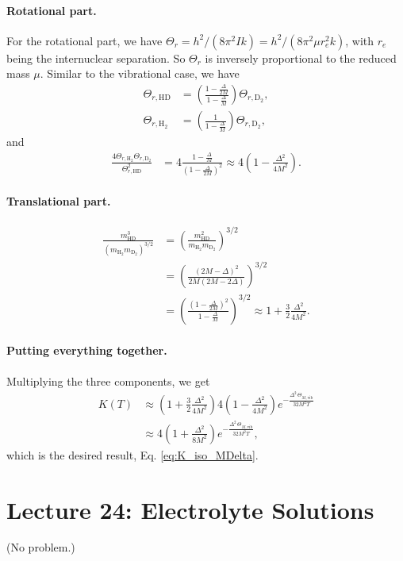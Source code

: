 \documentclass[twocolumn, 10pt]{article}
\numberwithin{equation}{section}
\newenvironment{solution}[1][\empty]
{\par\medskip\sffamily
  \textbf{\ifx\empty#1{Solution.}\relax\else{#1}\fi} \ignorespaces}
{\medskip}
\begin{document}
\begin{solution}
  \paragraph*{Rotational part.}
  For the rotational part,
  we have
  $\Theta_r = h^2/(8\pi^2Ik) = h^2/(8\pi^2\mu r_e^2 k)$,
  with $r_e$
  being the internuclear separation.
  So $\Theta_r$ is inversely proportional to
  the reduced mass $\mu$.
  Similar to the vibrational case, we have
  \begin{align*}
    \Theta_{r, \mathrm{HD}}
    &=
    \left(
    \frac{ 1 - \frac{\Delta}{2M} }
         { 1 - \frac{\Delta}{M} }
    \right)
    \Theta_{r, \mathrm{D}_2}
    ,
    \\
    \Theta_{r, \mathrm{H}_2}
    &=
    \left(
    \frac{ 1 }
         { 1-\frac{\Delta}{M} }
    \right)
    \Theta_{r, \mathrm{D}_2}
    ,
  \end{align*}
  and
  \begin{align*}
    \frac{
      4 \Theta_{r, \mathrm{H}_2}
      \Theta_{r, \mathrm{D}_2}
    } {
      \Theta_{r, \mathrm{HD}}^2
    }
    &=
    4\frac{ 1 - \frac{\Delta}{M} }
         { (1 - \frac{\Delta}{2M})^2 }
    \approx
    4\left(1 - \frac{ \Delta^2 } { 4 M^2 } \right)
    .
  \end{align*}

  \paragraph*{Translational part.}

  \begin{align*}
    \frac{
      m_{\mathrm{HD}}^3
    } {
      \left(
      m_{\mathrm{H}_2}
      m_{\mathrm{D}_2}
      \right)^{3/2}
    }
    &=
    \left(
    \frac{
      m_{\mathrm{HD}}^2
    } {
      m_{\mathrm{H}_2}
      m_{\mathrm{D}_2}
    }
    \right)^{3/2}
    \\
    &=
    \left(
    \frac{ (2M-\Delta)^2 }
     { 2M(2M-2\Delta) }
    \right)^{3/2}
    \\
    &=
    \left(
    \frac{ (1-\frac{\Delta}{2M})^2 }
     { 1-\frac{\Delta}{M} }
    \right)^{3/2}
    \approx
    1 + \frac{3}{2} \frac{\Delta^2}{4M^2}
    .
  \end{align*}

  \paragraph*{Putting everything together.}

  Multiplying the three components, we get
  \begin{align*}
    K(T)
    &\approx
    \left( 1 + \frac{3}{2} \frac{\Delta^2}{4M^2} \right)
    4\left(1 - \frac{\Delta^2}{4M^2} \right)
    e^{-\frac{ \Delta^2 \, \Theta_{M, \mathrm{vib}} }
             { 32 M^2 T } }
    \\
    &\approx
    4 \left( 1 + \frac{\Delta^2}{8M^2} \right)
    e^{-\frac{ \Delta^2 \, \Theta_{M, \mathrm{vib}} }
             { 32 M^2 T } }
    ,
  \end{align*}
  which is the desired result, Eq. \eqref{eq:K_iso_MDelta}.
\end{solution}

\section{Lecture 24: Electrolyte Solutions}

(No problem.)
\end{document}
